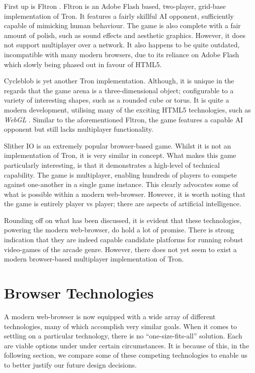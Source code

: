 \documentclass[class=article, crop=false]{standalone}
\begin{document}
		First up is Fltron \parencite{Fltron}. Fltron is an Adobe Flash based, two-player, grid-base implementation of Tron. It features a fairly skillful AI opponent, sufficiently capable of mimicking human behaviour. The game is also complete with a fair amount of polish, such as sound effects and aesthetic graphics. However, it does not support multiplayer over a network. It also happens to be quite outdated, incompatible with many modern browsers, due to its reliance on Adobe Flash which slowly being phased out in favour of HTML5. \parencite{Html5Flash} 

		Cycleblob \parencite{Cycleblob} is yet another Tron implementation. Although, it is unique in the regards that the game arena is a three-dimensional object; configurable to a variety of interesting shapes, such as a rounded cube or torus. It is quite a modern development, utilising many of the exciting HTML5 technologies, such as \emph{WebGL} \parencite{WebGl}. Similar to the aforementioned Fltron, the game features a capable AI opponent but still lacks multiplayer functionality.

		Slither IO \parencite{SlitherIo} is an extremely popular browser-based game. Whilst it is not an implementation of Tron, it is very similar in concept. What makes this game particularly interesting, is that it demonstrates a high-level of technical capability. The game is multiplayer, enabling hundreds of players to compete against one-another in a single game instance. This clearly advocates some of what is possible within a modern web-browser. However, it is worth noting that the game is entirely player vs player; there are aspects of artificial intelligence.

		Rounding off on what has been discussed, it is evident that these technologies, powering the modern web-browser, do hold a lot of promise. There is strong indication that they are indeed capable candidate platforms for running robust video-games of the arcade genre. However, there does not yet seem to exist a modern browser-based multiplayer implementation of Tron.

	\section{Browser Technologies} \label{sec:browserTechnologies}
		A modern web-browser is now equipped with a wide array of different technologies, many of which accomplish very similar goals. When it comes to settling on a particular technology, there is no \enquote{one-size-fits-all} solution. Each are viable options under under certain circumstances. It is because of this, in the following section, we compare some of these competing technologies to enable us to better justify our future design decisions.
\end{document}
